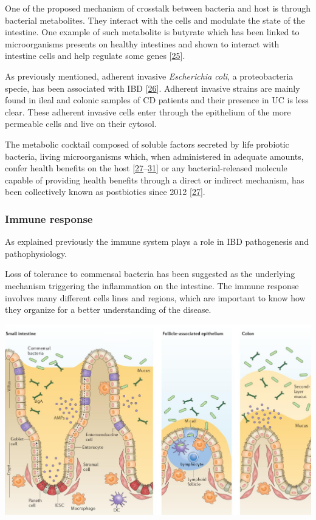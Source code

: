 \documentclass[
  12pt,
  a4paper,
  twoside,
  openright]{book}
\let\origfigure\figure
\let\endorigfigure\endfigure
\renewenvironment{figure}[1][2] {
    \expandafter\origfigure\expandafter[!htp]
} {
    \endorigfigure
}
\begin{document}
One of the proposed mechanism of crosstalk between bacteria and host is through bacterial metabolites.
They interact with the cells and modulate the state of the intestine.
One example of such metabolite is butyrate which has been linked to microorganisms presents on healthy intestines and shown to interact with intestine cells and help regulate some genes {[}\protect\hyperlink{ref-ferrer-picuxf3n2020}{25}{]}.

As previously mentioned, adherent invasive \emph{Escherichia coli}, a proteobacteria specie, has been associated with IBD {[}\protect\hyperlink{ref-darfeuille-michaud1998}{26}{]}.
Adherent invasive strains are mainly found in ileal and colonic samples of CD patients and their presence in UC is less clear.
These adherent invasive cells enter through the epithelium of the more permeable cells and live on their cytosol.

The metabolic cocktail composed of soluble factors secreted by life probiotic bacteria, living microorganisms which, when administered in adequate amounts, confer health benefits on the host {[}\protect\hyperlink{ref-tsilingiri2012}{27}--\protect\hyperlink{ref-morelli2012}{31}{]} or any bacterial-released molecule capable of providing health benefits through a direct or indirect mechanism, has been collectively known as postbiotics since 2012 {[}\protect\hyperlink{ref-tsilingiri2012}{27}{]}.

\hypertarget{immune-response}{%
\subsubsection{Immune response}\label{immune-response}}

As explained previously the immune system plays a role in IBD pathogenesis and pathophysiology.

Loss of tolerance to commensal bacteria has been suggested as the underlying mechanism triggering the inflammation on the intestine.
The immune response involves many different cells lines and regions, which are important to know how they organize for a better understanding of the disease.

\begin{figure}
\includegraphics[width=1\linewidth]{images/tesis_AC_FigureX} \caption{The intestinal epithelial barrier.}\label{fig:barrier}
\end{figure}
\end{document}

